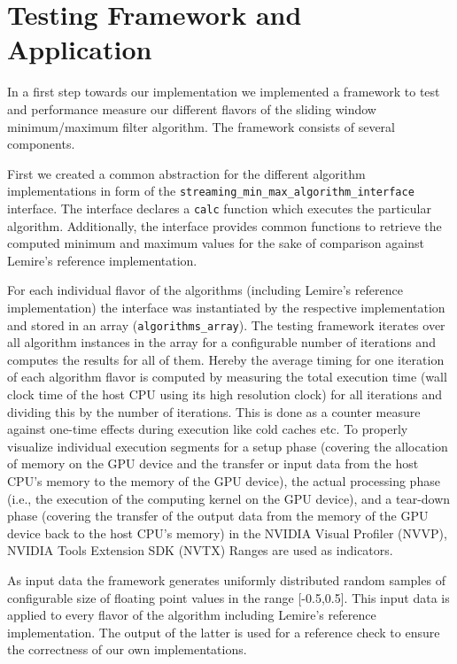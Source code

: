 \section{Testing Framework and Application}
In a first step towards our implementation we implemented a framework to test and performance measure our different flavors of the sliding window minimum/maximum filter algorithm. The framework consists of several components.

First we created a common abstraction for the different algorithm implementations in form of the \texttt{streaming\_min\_max\_algorithm\_interface} interface. The interface declares a \texttt{calc} function which executes the particular algorithm. Additionally, the interface provides common functions to retrieve the computed minimum and maximum values for the sake of comparison against Lemire's reference implementation.

For each individual flavor of the algorithms (including Lemire's reference implementation) the interface was instantiated by the respective implementation and stored in an array (\texttt{algorithms\_array}). The testing framework iterates over all algorithm instances in the array for a configurable number of iterations and computes the results for all of them. Hereby the average timing for one iteration of each algorithm flavor is computed by measuring the total execution time (wall clock time of the host CPU using its high resolution clock) for all iterations and dividing this by the number of iterations. This is done as a counter measure against one-time effects during execution like cold caches etc. To properly visualize individual execution segments for a setup phase (covering the allocation of memory on the GPU device and the transfer or input data from the host CPU's memory to the memory of the GPU device), the actual processing phase (i.e., the execution of the computing kernel on the GPU device), and a tear-down phase (covering the transfer of the output data from the memory of the GPU device back to the host CPU's memory) in the NVIDIA Visual Profiler (NVVP), NVIDIA Tools Extension SDK (NVTX) Ranges are used as indicators.

As input data the framework generates uniformly distributed random samples of configurable size of floating point values in the range [-0.5,0.5]. This input data is applied to every flavor of the algorithm including Lemire's reference implementation. The output of the latter is used for a reference check to ensure the correctness of our own implementations. 

